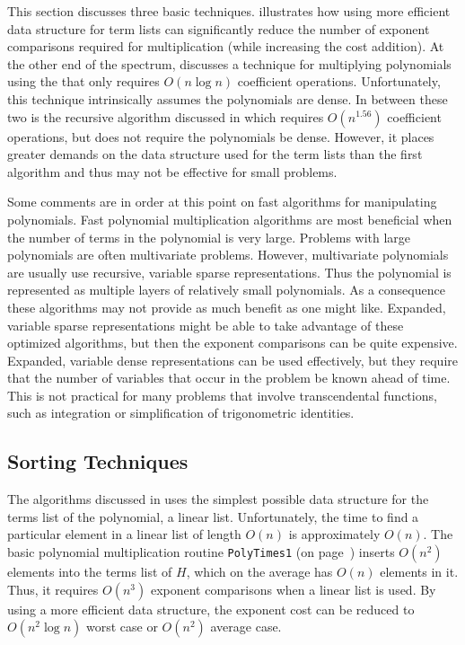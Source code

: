 This section discusses three basic techniques. 
illustrates how using more efficient data structure for term lists can
significantly reduce the number of exponent comparisons required for
multiplication (while increasing the cost addition).  At the other end
of the spectrum,  discusses a technique for
multiplying polynomials using the  that
only requires $O(n \log n)$ coefficient operations.  Unfortunately,
this technique intrinsically assumes the polynomials are dense.  In
between these two is the recursive algorithm discussed in
 which requires $O(n^{1.56})$ coefficient
operations, but does not require the polynomials be dense.  However,
it places greater demands on the data structure used for the term
lists than the first algorithm and thus may not be effective for small
problems.

Some comments are in order at this point on fast algorithms for
manipulating polynomials.  Fast polynomial multiplication algorithms
are most beneficial when the number of terms in the polynomial is very
large.  Problems with large polynomials are often multivariate
problems.  However, multivariate polynomials are usually use
recursive, variable sparse representations.  Thus the polynomial is
represented as multiple layers of relatively small polynomials.  As a
consequence these algorithms may not provide as much benefit as one
might like. Expanded, variable sparse representations might be able to
take advantage of these optimized algorithms, but then the exponent
comparisons can be quite expensive.  Expanded, variable dense
representations can be used effectively, but they require that the
number of variables that occur in the problem be known ahead of time.
This is not practical for many problems that involve transcendental
functions, such as integration or simplification of trigonometric
identities.

\subsection{Sorting Techniques}
\label{Poly:Sort:Sec}

The algorithms discussed in  uses the simplest
possible data structure for the terms list of the polynomial, a linear
list.  Unfortunately, the time to find a particular element in a
linear list of length $O(n)$ is approximately $O(n)$.  The basic
polynomial multiplication routine {\tt PolyTimes1} (on
page~\pageref{PolyTimes1:Alg}) inserts $O(n^2)$ elements into the
terms list of $H$, which on the average has $O(n)$ elements in it.
Thus, it requires $O(n^3)$ exponent comparisons when a linear list is
used.  By using a more efficient data structure, the exponent cost can
be reduced to $O(n^2 \log n)$ worst case or $O(n^2)$ average case.

